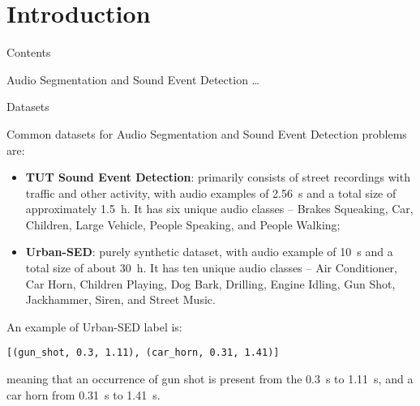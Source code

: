 

\section[Introduction]{Introduction}

	\begin{frame}{Contents}
			
		\tableofcontents
		
		\note{
			\dots			
		}		
		
	\end{frame}
	
	\begin{frame}{Audio Segmentation and Sound Event Detection}
		\dots		
		
		\note{
			\dots
		}
	\end{frame}
	
	\begin{frame}{Datasets}
	
		Common datasets for Audio Segmentation and Sound Event Detection problems are:
		
		\begin{itemize}
			\item \textbf{TUT Sound Event Detection}: primarily consists of street recordings with traffic and other activity, with audio examples of \SI{2.56}{\second} and a total size of approximately \SI{1.5}{\hour}. It has six unique audio classes -- Brakes Squeaking, Car, Children, Large Vehicle, People Speaking, and People Walking;
			\item \textbf{Urban-SED}: purely synthetic dataset, with audio example of \SI{10}{\second} and a total size of about \SI{30}{\hour}. It has ten unique audio classes -- Air Conditioner, Car Horn, Children Playing, Dog Bark, Drilling, Engine Idling, Gun Shot, Jackhammer, Siren, and Street Music.
		\end{itemize}
		
		An example of Urban-SED label is:\\
		\centerline{\texttt{[(gun\_shot, 0.3, 1.11), (car\_horn, 0.31, 1.41)]}}
		meaning that an occurrence of gun shot is present from the \SI{0.3}{\second} to \SI{1.11}{\second}, and a car horn from \SI{0.31}{\second} to \SI{1.41}{\second}.
		
		\note{
			\dots
		}
	\end{frame}
	
